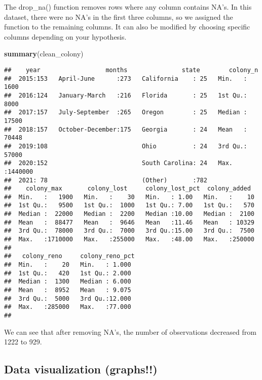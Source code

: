 \documentclass[
]{article}
\newenvironment{Shaded}{\begin{snugshade}}{\end{snugshade}}
\newcommand{\FunctionTok}[1]{\textcolor[rgb]{0.13,0.29,0.53}{\textbf{#1}}}
\newcommand{\NormalTok}[1]{#1}
\begin{document}
The drop\_na() function removes rows where any column contains NA's. In
this dataset, there were no NA's in the first three columns, so we
assigned the function to the remaining columns. It can also be modified
by choosing specific columns depending on your hypothesis.

\begin{Shaded}
\begin{Highlighting}[]
\FunctionTok{summary}\NormalTok{(clean\_colony)}
\end{Highlighting}
\end{Shaded}

\begin{verbatim}
##    year                  months               state        colony_n      
##  2015:153   April-June      :273   California    : 25   Min.   :   1600  
##  2016:124   January-March   :216   Florida       : 25   1st Qu.:   8000  
##  2017:157   July-September  :265   Oregon        : 25   Median :  17500  
##  2018:157   October-December:175   Georgia       : 24   Mean   :  70448  
##  2019:108                          Ohio          : 24   3rd Qu.:  57000  
##  2020:152                          South Carolina: 24   Max.   :1440000  
##  2021: 78                          (Other)       :782                    
##    colony_max       colony_lost     colony_lost_pct  colony_added   
##  Min.   :   1900   Min.   :    30   Min.   : 1.00   Min.   :    10  
##  1st Qu.:   9500   1st Qu.:  1000   1st Qu.: 7.00   1st Qu.:   570  
##  Median :  22000   Median :  2200   Median :10.00   Median :  2100  
##  Mean   :  88477   Mean   :  9646   Mean   :11.46   Mean   : 10329  
##  3rd Qu.:  78000   3rd Qu.:  7000   3rd Qu.:15.00   3rd Qu.:  7500  
##  Max.   :1710000   Max.   :255000   Max.   :48.00   Max.   :250000  
##                                                                     
##   colony_reno     colony_reno_pct 
##  Min.   :    20   Min.   : 1.000  
##  1st Qu.:   420   1st Qu.: 2.000  
##  Median :  1300   Median : 6.000  
##  Mean   :  8952   Mean   : 9.075  
##  3rd Qu.:  5000   3rd Qu.:12.000  
##  Max.   :285000   Max.   :77.000  
## 
\end{verbatim}

We can see that after removing NA's, the number of observations
decreased from 1222 to 929.

\subsection{Data visualization
(graphs!!)}\label{data-visualization-graphs}
\end{document}
